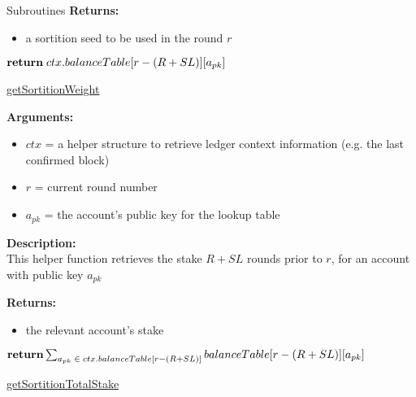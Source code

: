 \documentclass[10pt,a4paper]{article}
\begin{document}
\begin{section}{Subroutines}
\noindent \textbf{Returns:}
\begin{itemize}
    \item a sortition seed to be used in the round $r$
  \end{itemize}


\begin{algorithm}[H]\label{algo:get-sortition-weight}
    \begin{algorithmic}[1]

            $\Return\;ctx.balanceTable[r - (R + SL)][a_{pk}]$

        \EndFunction
    \end{algorithmic}
    \caption{\underline{getSortitionWeight}}
\end{algorithm}

\noindent \textbf{Arguments:}
\begin{itemize}
    \item $ctx$ = a helper structure to retrieve ledger context information (e.g. the last confirmed block)
    \item $r$ = current round number
    \item $a_{pk}$ = the account's public key for the lookup table
  \end{itemize}


\noindent \textbf{Description:}\\
This helper function retrieves the stake $R + SL$ rounds prior to $r$, for an account
with public key $a_{pk}$

\noindent \textbf{Returns:}
\begin{itemize}
    \item the relevant account's stake
  \end{itemize}




\begin{algorithm}[H]\label{algo:get-sortition-W}
    \begin{algorithmic}[1]
        
        $\Return \sum_{a_{pk}\;\in\;ctx.balanceTable[r - (R + SL)]}{balanceTable[r - (R + SL)][a_{pk}]}$

        \EndFunction
    \end{algorithmic}
    \caption{\underline{getSortitionTotalStake}}
\end{algorithm}


\end{section}
\end{document}
